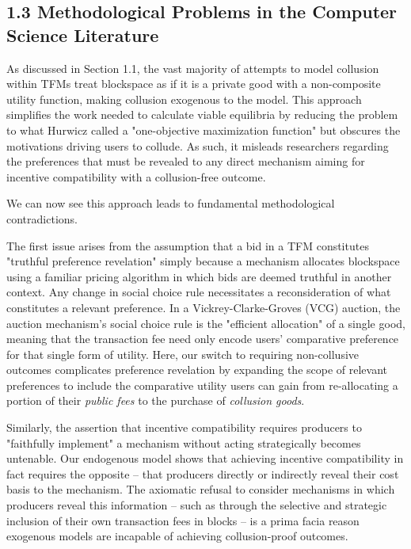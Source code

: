 \documentclass[oneside]{article}   	%
\begin{document}
\subsection*{1.3 Methodological Problems in the Computer Science Literature}

As discussed in Section 1.1, the vast majority of attempts to model collusion within TFMs treat blockspace as if it is a private good with a non-composite utility function, making collusion exogenous to the model. This approach simplifies the work needed to calculate viable equilibria by reducing the problem to what Hurwicz called a "one-objective maximization function" but obscures the motivations driving users to collude. As such, it misleads researchers regarding the preferences that must be revealed to any direct mechanism aiming for incentive compatibility with a collusion-free outcome. 

We can now see this approach leads to fundamental methodological contradictions.

The first issue arises from the assumption that a bid in a TFM constitutes "truthful preference revelation" simply because a mechanism allocates blockspace using a familiar pricing algorithm in which bids are deemed truthful in another context. Any change in social choice rule necessitates a reconsideration of what constitutes a relevant preference. In a Vickrey-Clarke-Groves (VCG) auction, the auction mechanism's social choice rule is the "efficient allocation" of a single good, meaning that the transaction fee need only encode users' comparative preference for that single form of utility. Here, our switch to requiring non-collusive outcomes complicates preference revelation by expanding the scope of relevant preferences to include the comparative utility users can gain from re-allocating a portion of their \textit{public fees} to the purchase of \textit{collusion goods}.

Similarly, the assertion that incentive compatibility requires producers to "faithfully implement" a mechanism without acting strategically becomes untenable. Our endogenous model shows that achieving incentive compatibility in fact requires the opposite -- that producers directly or indirectly reveal their cost basis to the mechanism. The axiomatic refusal to consider mechanisms in which producers reveal this information -- such as through the selective and strategic inclusion of their own transaction fees in blocks -- is a prima facia reason exogenous models are incapable of achieving collusion-proof outcomes.
\end{document}
